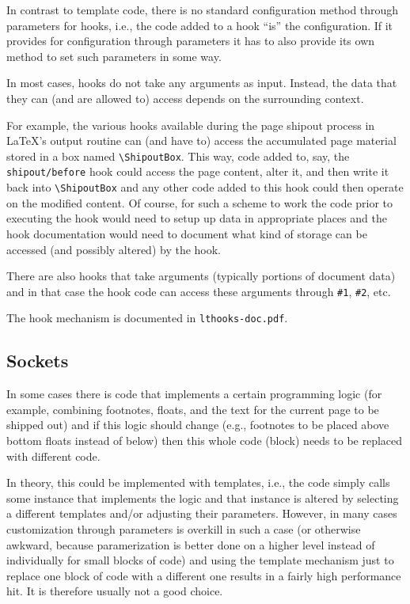 \documentclass{article}
\begin{document}
In contrast to template code, there is no standard configuration method
through parameters for hooks, i.e., the code added to a hook \enquote{is} the
configuration. If it provides for configuration through parameters it
has to also provide its own method to set such parameters in some way.

In most cases, hooks do not take any arguments as input. Instead, the data
that they can (and are allowed to) access depends on the surrounding
context.

For example, the various hooks available during the page shipout
process in \LaTeX's output routine can (and have to) access the
accumulated page material stored in a box named
\verb=\ShipoutBox=. This way, code added to, say, the
\texttt{shipout/before} hook could access the page content, alter it,
and then write it back into \verb=\ShipoutBox= and any other code
added to this hook could then operate on the modified content.  Of
course, for such a scheme to work the code prior to executing the hook
would need to setup up data in appropriate places and the hook
documentation would need to document what kind of storage can be
accessed (and possibly altered) by the hook.

There are also hooks that take arguments (typically portions of
document data) and in that case the hook code can access these
arguments through \verb=#1=, \verb=#2=, etc.

The hook mechanism is documented in \texttt{lthooks-doc.pdf}.

\subsection{Sockets}

In some cases there is code that implements a certain programming
logic (for example, combining footnotes, floats, and the text for the
current page to be shipped out) and if this logic should change (e.g.,
footnotes to be placed above bottom floats instead of below) then this
whole code (block) needs to be replaced with different code.

In theory, this could be implemented with templates, i.e., the code
simply calls some instance that implements the logic and that instance
is altered by selecting a different templates and/or adjusting their
parameters. However, in many cases customization through parameters is
overkill in such a case (or otherwise awkward, because paramerization
is better done on a higher level instead of individually for small
blocks of code) and using the template mechanism just to replace one
block of code with a different one results in a fairly high
performance hit. It is therefore usually not a good choice.
\end{document}
